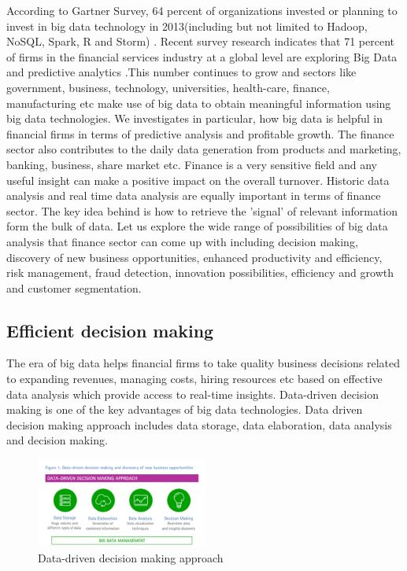 \documentclass[sigconf]{acmart}
\begin{document}
According to Gartner Survey, 64 percent of organizations invested or planning to invest in big data technology in 2013(including but not limited to Hadoop, NoSQL, Spark, R and Storm) \cite{gartner-survey}. Recent survey research indicates that 71 percent of firms in the financial services
industry at a global level are exploring Big
Data and predictive analytics \cite{Accenture-Next-Generation-Financial}.This number continues to grow and sectors like government, business, technology, universities, health-care, finance, manufacturing etc make use of big data to obtain meaningful information using big data technologies\cite{/wiki/Big_data}. We investigates in particular, how big data is helpful in financial firms in terms of predictive analysis and profitable growth. The finance sector also contributes to the daily data generation from products and marketing, banking, business, share market etc. Finance is a very sensitive field and any useful insight can make a positive impact on the overall turnover. Historic data analysis and real time data analysis are equally important in terms of finance sector. The key idea behind is how to retrieve the 'signal' of relevant information form the bulk of data. Let us explore the wide range of possibilities of big data analysis that finance sector can come up with including decision making, discovery of new business opportunities, enhanced productivity and efficiency, risk management, fraud detection, innovation possibilities, efficiency and growth and customer segmentation.

\subsection{Efficient decision making}

The era of big data helps financial firms to take quality business decisions related to expanding revenues, managing costs, hiring resources etc based on effective data analysis which provide access to real-time insights.  Data-driven decision making is one of the key advantages of big data technologies. Data driven decision making approach includes data storage, data elaboration, data analysis and decision making\cite{Accenture-Next-Generation-Financial}.

\begin{figure}
  \centering
  \includegraphics[width=0.5\textwidth]{images/Figure1.png}
  \caption{Data-driven decision making approach 
  \cite{Accenture-Next-Generation-Financial}} 
  \label{fig:Figure1} 
\end{figure}
\end{document}
